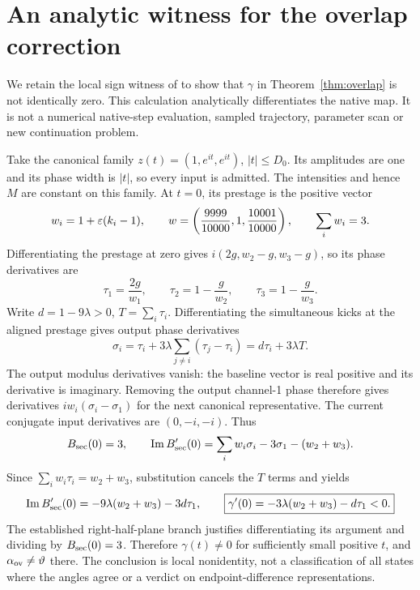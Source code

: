 \section{An analytic witness for the overlap correction}\label{app:witness}

We retain the local sign witness of \cite[Section 5.3]{phase} to show that \(\gamma\) in Theorem~\ref{thm:overlap} is not identically zero. This calculation analytically differentiates the native map. It is not a numerical native-step evaluation, sampled trajectory, parameter scan or new continuation problem.

Take the canonical family \(z(t)=(1,e^{it},e^{it})\), \(|t|\le D_0\). Its amplitudes are one and its phase width is \(|t|\), so every input is admitted. The intensities and hence \(M\) are constant on this family. At \(t=0\), its prestage is the positive vector
\begin{equation}
w_i=1+\varepsilon(k_i-1),\qquad
w=\left(\frac{9999}{10000},1,\frac{10001}{10000}\right),\qquad \sum_i w_i=3.
\label{eq:witnessw}
\end{equation}
Differentiating the prestage at zero gives \(i(2g,w_2-g,w_3-g)\), so its phase derivatives are
\begin{equation}
\tau_1=\frac{2g}{w_1},\qquad \tau_2=1-\frac g{w_2},\qquad
\tau_3=1-\frac g{w_3}.
\label{eq:witnesstau}
\end{equation}
Write \(d=1-9\lambda>0\), \(T=\sum_i\tau_i\). Differentiating the simultaneous kicks at the aligned prestage gives output phase derivatives
\begin{equation}
\sigma_i=\tau_i+3\lambda\sum_{j\ne i}(\tau_j-\tau_i)
=d\tau_i+3\lambda T.
\label{eq:witnesssigma}
\end{equation}
The output modulus derivatives vanish: the baseline vector is real positive and its derivative is imaginary. Removing the output channel-1 phase therefore gives derivatives \(i w_i(\sigma_i-\sigma_1)\) for the next canonical representative. The current conjugate input derivatives are \((0,-i,-i)\). Thus
\begin{equation}
B_{\rm sec}(0)=3,\qquad
\operatorname{Im} B_{\rm sec}'(0)=\sum_i w_i\sigma_i-3\sigma_1-(w_2+w_3).
\label{eq:witnessB}
\end{equation}
Since \(\sum_iw_i\tau_i=w_2+w_3\), substitution cancels the \(T\) terms and yields
\begin{equation}
\operatorname{Im} B_{\rm sec}'(0)=-9\lambda(w_2+w_3)-3d\tau_1,
\qquad
\boxed{\gamma'(0)=-3\lambda(w_2+w_3)-d\tau_1<0.}
\label{eq:witnesssign}
\end{equation}
The established right-half-plane branch justifies differentiating its argument and dividing by \(B_{\rm sec}(0)=3\). Therefore \(\gamma(t)\ne0\) for sufficiently small positive \(t\), and \(\alpha_{\rm ov}\ne\vartheta\) there. The conclusion is local nonidentity, not a classification of all states where the angles agree or a verdict on endpoint-difference representations.
